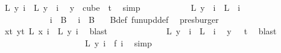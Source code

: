 \begin{isabellebody}
\ {\isachardoublequoteopen}{\isacharquery}{\kern0pt}L\ y\ i\ {\isacharequal}{\kern0pt}\ L\ {\isacharparenleft}{\kern0pt}y\ {}{\isacharparenright}{\kern0pt}\ i{\isachardoublequoteclose}\ \isamarkupfalse%
\ {\isacartoucheopen}y\ {\isasymin}\ cube\ {}\ t{\isacartoucheclose}\ \isamarkupfalse%
\ simp\isanewline
\ \ \ \ \ \ \ \ \isamarkupfalse%
\ \isamarkupfalse%
\ {\isachardoublequoteopen}L\ {\isacharparenleft}{\kern0pt}y\ {}{\isacharparenright}{\kern0pt}\ i\ {\isacharequal}{\kern0pt}\ L\ {}\ i{\isachardoublequoteclose}\ \isanewline
\ \ \ \ \ \ \ \ \isamarkupfalse%
\ {\isacharminus}{\kern0pt}\isanewline
\ \ \ \ \ \ \ \ \ \ \isamarkupfalse%
\ {\isachardoublequoteopen}i\ {\isasymin}\ {\isacharquery}{\kern0pt}B{}{\isachardoublequoteclose}\ \isamarkupfalse%
\ {\isacartoucheopen}i\ {\isasymin}\ B\ {}{\isacartoucheclose}\ \isamarkupfalse%
\ B{\isacharunderscore}{\kern0pt}def\ fun{\isacharunderscore}{\kern0pt}upd{\isacharunderscore}{\kern0pt}def\ \isamarkupfalse%
\ presburger\isanewline
\ \ \ \ \ \ \ \ \ \ \isamarkupfalse%
\ \isamarkupfalse%
\ {\isachardoublequoteopen}{\isacharparenleft}{\kern0pt}{\isasymforall}x{\isacharless}{\kern0pt}t{\isachardot}{\kern0pt}\ {\isasymforall}y{\isacharless}{\kern0pt}t{\isachardot}{\kern0pt}\ L\ x\ i\ {\isacharequal}{\kern0pt}\ L\ y\ i{\isacharparenright}{\kern0pt}{\isachardoublequoteclose}\ \isamarkupfalse%
\ blast\isanewline
\ \ \ \ \ \ \ \ \ \ \isamarkupfalse%
\ \isamarkupfalse%
\ {\isachardoublequoteopen}L\ {\isacharparenleft}{\kern0pt}y\ {}{\isacharparenright}{\kern0pt}\ i\ {\isacharequal}{\kern0pt}\ L\ {}\ i{\isachardoublequoteclose}\ \isamarkupfalse%
\ {\isacartoucheopen}y\ {}\ {\isasymin}\ {\isacharbraceleft}{\kern0pt}{\isachardot}{\kern0pt}{\isachardot}{\kern0pt}{\isacharless}{\kern0pt}t{\isacharbraceright}{\kern0pt}{\isacartoucheclose}\ \isamarkupfalse%
\ blast\isanewline
\ \ \ \ \ \ \ \ \isamarkupfalse%
\isanewline
\ \ \ \ \ \ \ \ \isamarkupfalse%
\ \isamarkupfalse%
\ {\isachardoublequoteopen}{\isacharquery}{\kern0pt}L\ y\ i\ {\isacharequal}{\kern0pt}\ {\isacharquery}{\kern0pt}f\ i{\isachardoublequoteclose}\ \isamarkupfalse%
\ simp\isanewline
\ \ \ \ \ \ \isamarkupfalse%

\end{isabellebody}
